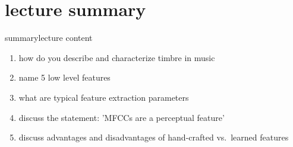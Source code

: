     \section[summary]{lecture summary}
        \begin{frame}{summary}{lecture content}
            \begin{enumerate}
                \item   how do you describe and characterize timbre in music
                \smallskip
                \item<2->   name 5 low level features
                \smallskip
                \item<3->   what are typical feature extraction parameters 
                \smallskip
                \item<4->   discuss the statement: 'MFCCs are a perceptual feature'
                \smallskip
                \item<5->   discuss advantages and disadvantages of hand-crafted vs.\ learned features
            \end{enumerate}
        \end{frame}


